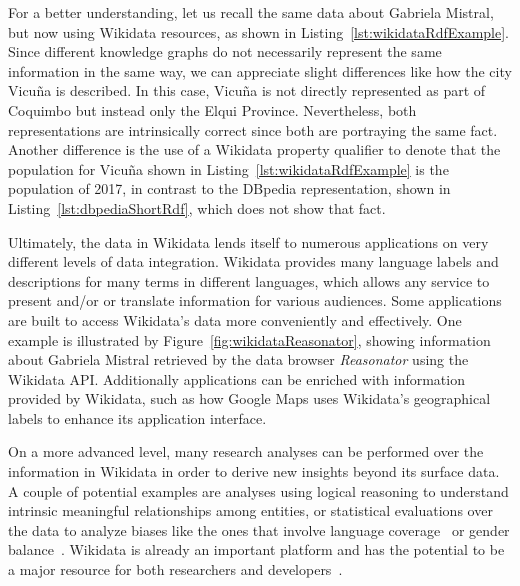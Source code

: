 
For a better understanding, let us recall the same data about Gabriela Mistral, but now using 
Wikidata resources, as shown in Listing~\ref{lst:wikidataRdfExample}. Since different knowledge 
graphs do not necessarily represent the same information in the same way, we can appreciate slight 
differences like how the city Vicuña is described. In this case, Vicuña is not directly represented 
as part of Coquimbo but instead only the Elqui Province. Nevertheless, both representations are 
intrinsically correct since both are portraying the same fact. Another difference is the use of 
a Wikidata property qualifier to denote that the population for Vicuña shown in 
Listing~\ref{lst:wikidataRdfExample} is the population of 2017, in contrast to the DBpedia 
representation, shown in Listing~\ref{lst:dbpediaShortRdf}, which does not show that fact.

Ultimately, the data in Wikidata lends itself to numerous applications on very different levels 
of data integration. Wikidata provides many language labels and descriptions for many terms in 
different languages, which allows any service to present and/or or translate information for 
various audiences. Some applications are built to access Wikidata’s data more conveniently and 
effectively. One example is illustrated by Figure~\ref{fig:wikidataReasonator}, showing 
information about Gabriela Mistral retrieved by the data browser 
\textit{Reasonator} using the Wikidata API. Additionally 
applications can be enriched with information provided by Wikidata, such as how Google Maps 
uses Wikidata’s geographical labels to enhance its application interface. 

On a more advanced level, many research analyses can be performed over the information in 
Wikidata in order to derive new insights beyond its surface data. A couple of potential examples 
are analyses using logical reasoning to understand intrinsic meaningful relationships among 
entities, or statistical evaluations over the data to analyze biases like the ones that involve 
language coverage~\cite{key:wikidataHale13} or gender balance~\cite{key:socialWikidataWagner16}. 
Wikidata is already an important platform and has the potential to be a major resource for both 
researchers and developers~\cite{wikidata:GeneWikiInitiative, wikidata:RiseWikidataVrandecic6682924}.
